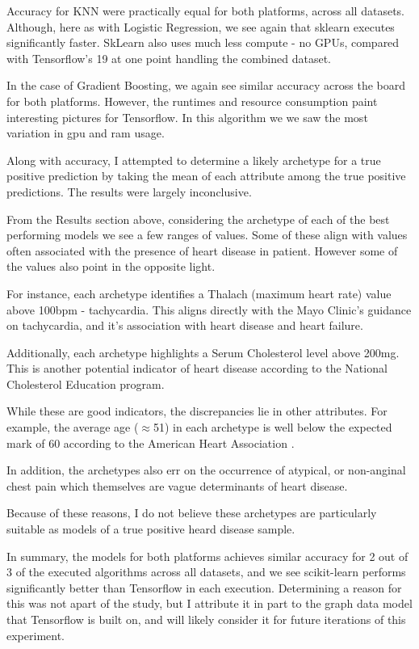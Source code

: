 \documentclass[conference]{IEEEtran}
\begin{document}
Accuracy for KNN were practically equal for both platforms, across all datasets. Although, here as with Logistic Regression, we see again that sklearn executes significantly faster. SkLearn also uses much less compute - no GPUs, compared with Tensorflow's 19 at one point handling the combined dataset.

In the case of Gradient Boosting, we again see similar accuracy across the board for both platforms. However, the runtimes and resource consumption paint interesting pictures for Tensorflow. In this algorithm we we saw the most variation in gpu and ram usage. 

Along with accuracy, I attempted to determine a likely archetype for a true positive prediction by taking the mean of each attribute among the true positive predictions. The results were largely inconclusive. 

From the Results section above, considering the archetype of each of the best performing models we see a few ranges of values. Some of these align with values often associated with the presence of heart disease in patient. However some of the values also point in the opposite light. 

For instance, each archetype identifies a Thalach (maximum heart rate) value above 100bpm - tachycardia. This aligns directly with the Mayo Clinic's guidance on tachycardia, and it's association with heart disease and heart failure\cite{b19}. 

Additionally, each archetype highlights a Serum Cholesterol level above 200mg. This is another potential indicator of heart disease according to the National Cholesterol Education program\cite{b20}. 

While these are good indicators, the discrepancies lie in other attributes. For example, the average age ($\approx$51) in each archetype is well below the expected mark of 60 according to the American Heart Association \cite{b21}.

In addition, the archetypes also err on the occurrence of atypical, or non-anginal chest pain which themselves are vague determinants of heart disease\cite{b22}.

Because of these reasons, I do not believe these archetypes are particularly suitable as models of a true positive heard disease sample. 

In summary, the models for both platforms achieves similar accuracy for 2 out of 3 of the executed algorithms across all datasets, and we see scikit-learn performs significantly better than Tensorflow in each execution. Determining a reason for this was not apart of the study, but I attribute it in part to the graph data model that Tensorflow is built on, and will likely consider it for future iterations of this experiment. 
\end{document}
